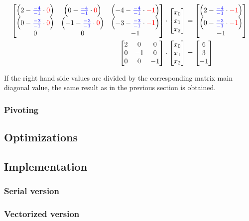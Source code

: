 \begin{align*}
\begin{bmatrix}
\left(2 - \textcolor{blue}{\frac{-4}{-1}} \cdot \textcolor{red}{0} \right)&
\left(0 - \textcolor{blue}{\frac{-4}{-1}} \cdot \textcolor{red}{0} \right)&
\left(-4 - \textcolor{blue}{\frac{-4}{-1}} \cdot \textcolor{red}{-1} \right)\\
\left(0 - \textcolor{blue}{\frac{-3}{-1}} \cdot \textcolor{red}{0} \right)&
\left(-1 - \textcolor{blue}{\frac{-3}{-1}} \cdot \textcolor{red}{0} \right)&
\left(-3 - \textcolor{blue}{\frac{-3}{-1}} \cdot \textcolor{red}{-1} \right)\\
0&
0&
-1\\
\end{bmatrix}
&\cdot
\begin{bmatrix}
x_0\\
x_1\\
x_2\\
\end{bmatrix}
=
\begin{bmatrix}
\left(2 - \textcolor{blue}{\frac{-4}{-1}} \cdot \textcolor{red}{-1} \right)\\
\left(0 - \textcolor{blue}{\frac{-3}{-1}} \cdot \textcolor{red}{-1} \right)\\
-1\\
\end{bmatrix}
\\
\begin{bmatrix}
2&0&0\\
0&-1&0\\
0&0&-1\\
\end{bmatrix}
&\cdot
\begin{bmatrix}
x_0\\
x_1\\
x_2\\
\end{bmatrix}
=
\begin{bmatrix}
6\\
3\\
-1\\
\end{bmatrix}
\end{align*}

If the right hand side values are divided by the corresponding matrix main diagonal value, the same result as in the previous section is obtained.


\subsubsection{Pivoting}


\subsection{Optimizations}

\subsection{Implementation}
\subsubsection{Serial version}
\subsubsection{Vectorized version}